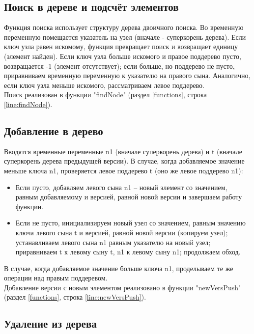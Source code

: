 \documentclass[zuev-23631-2-report.tex]{subfiles}
\begin{document}
\subsection{Поиск в дереве и подсчёт элементов}
Функция поиска использует структуру дерева двоичного поиска. Во временную переменную помещается указатель на узел (вначале - суперкорень дерева). Если ключ узла равен искомому, функция прекращает поиск и возвращает единицу (элемент найден). Если ключ узла больше искомого и правое поддерево пусто, возвращается -1 (элемент отсутствует); если больше, но поддерево не пусто, приравниваем временную переменную к указателю на правого сына. Аналогично, если ключ узла меньше искомого, рассматриваем левое поддерево.\\
Поиск реализован в функции "findNode"\hspace{0pt} (раздел \ref{functions}, строка \ref{line:findNode}).\\

\subsection{Добавление в дерево}

Вводятся временные переменные n1 (вначале суперкорень дерева) и t (вначале суперкорень дерева предыдущей версии). В случае, когда добавляемое значение меньше ключа n1, проверяется левое поддерево t (оно же левое поддерево n1): 
\begin{itemize}
\item{}Если пусто, добавляем левого сына n1 -- новый элемент со значением, равным добавляемому и версией, равной новой версии и завершаем работу функции. 
\item{}Если не пусто, инициализируем новый узел со значением, равным значению ключа левого сына t и версией, равной новой версии (копируем узел); устанавливаем левого сына n1 равным указателю на новый узел; приравниваем t к левому сыну t, n1 к левому сыну n1; продолжаем обход.
\end{itemize}
В случае, когда добавляемое значение больше ключа n1, проделываем те же операции над правым поддеревом.\\
Добавление версии с новым элементом реализовано в функции "newVersPush"\hspace{0pt} (раздел \ref{functions}, строка \ref{line:newVersPush}).\\

\subsection{Удаление из дерева}
\end{document}
